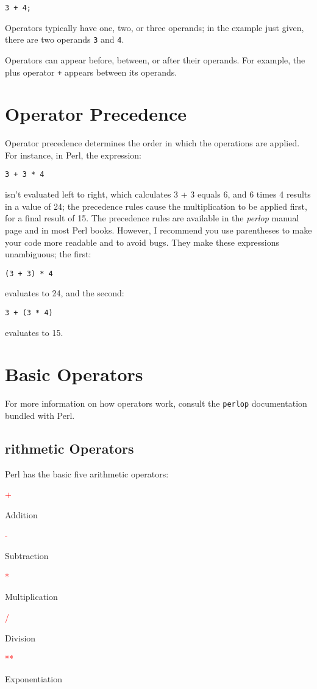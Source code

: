 \begin{lstlisting}
3 + 4;
\end{lstlisting}

Operators typically have one, two, or three operands; in the example just given, there are two operands \verb|3| and \verb|4|.

Operators can appear before, between, or after their operands. For example, the plus operator \verb|+| appears between its operands.

\section{Operator Precedence}
Operator precedence determines the order in which the operations are applied. For instance, in Perl, the expression:

\begin{lstlisting}
3 + 3 * 4
\end{lstlisting}

isn't evaluated left to right, which calculates 3 + 3 equals 6, and 6 times 4 results in a value of 24; the precedence rules cause the multiplication to be applied first, for a final result of 15. The precedence rules are available in the \textit{perlop} manual page and in most Perl books. However, I recommend you use parentheses to make your code more readable and to avoid bugs. They make these expressions unambiguous; the first:

\begin{lstlisting}
(3 + 3) * 4
\end{lstlisting}

evaluates to 24, and the second:

\begin{lstlisting}
3 + (3 * 4)
\end{lstlisting}

evaluates to 15.

\section{Basic Operators}
For more information on how operators work, consult the \verb|perlop| documentation bundled with Perl. 

\subsection{rithmetic Operators}
Perl has the basic five arithmetic operators:

\textcolor{red}{+}
\begin{adjustwidth}{1cm}{}
Addition
\end{adjustwidth}
\textcolor{red}{-}
\begin{adjustwidth}{1cm}{}
Subtraction
\end{adjustwidth}
\textcolor{red}{*}
\begin{adjustwidth}{1cm}{}
Multiplication
\end{adjustwidth}
\textcolor{red}{/}
\begin{adjustwidth}{1cm}{}
Division
\end{adjustwidth}
\textcolor{red}{**}
\begin{adjustwidth}{1cm}{}
Exponentiation
\end{adjustwidth}

